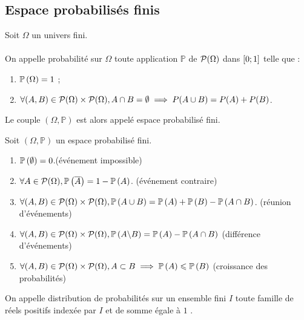 \subsection{Espace probabilisés finis}
\begin{defi}
    Soit \(\Omega\) un univers fini.\\~\\
    On appelle probabilité sur \(\Omega\) toute application \(\mathbb{P}\) de \(\cal{P}(\Omega)\) dans \(\intervii{0}{1}\) telle que :
    \begin{enumerate}
        \item \(\proba{\Omega} = 1\) ;
        \item \(\forall (A, B) \in \cal{P} (\Omega) \times \cal{P} (\Omega), A \inter B = \emptyset \imp P(A \union B) = P(A) + P(B)\).
    \end{enumerate}
    Le couple \((\Omega, \mathbb{P})\) est alors appelé espace probabilisé fini.
\end{defi}
\begin{prop}
    Soit \((\Omega, \mathbb{P})\) un espace probabilisé fini.
    \begin{enumerate}
        \item \(\proba{\emptyset} = 0\).\hfill (événement impossible)
        \item \(\forall A \in \cal{P}(\Omega), \proba{\conj{A}} = 1 - \proba{A}\). \hfill (événement contraire)
        \item \(\forall(A, B) \in \cal{P}(\Omega) \times \cal{P}(\Omega), \proba{A \union B} = \proba{A} + \proba{B} - \proba{A \inter B}\). \hfill(réunion d’événements)
        \item \(\forall(A, B) \in \cal{P}(\Omega) \times \cal{P}(\Omega), \proba{A \pd B} = \proba{A} - \proba{A \inter B}\) \hfill (différence d’événements)
        \item \(\forall(A, B) \in \cal{P}(\Omega) \times \cal{P}(\Omega), A \subset B \imp \proba{A} \leq \proba{B}\) \hfill (croissance des probabilités)
    \end{enumerate}
\end{prop}
\begin{defprop}
    On appelle distribution de probabilités sur un ensemble fini \(I\) toute famille de réels positifs indexée par \(I\) et de somme égale à \(1\) .
\end{defprop}
